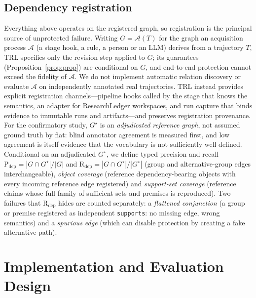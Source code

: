 \documentclass[cmc,article,submit,moreauthors,pdftex]{Definitions/tsp}
\begin{document}
\subsection{Dependency registration}
\label{sec:registration}
Everything above operates on the registered graph, so registration is the principal source of unprotected failure. Writing $G=\mathcal{A}(T)$ for the graph an acquisition process $\mathcal{A}$ (a stage hook, a rule, a person or an LLM) derives from a trajectory $T$, TRL specifies only the revision step applied to $G$; its guarantees (Proposition~\ref{prop:prop}) are conditional on $G$, and end-to-end protection cannot exceed the fidelity of $\mathcal{A}$. We do not implement automatic relation discovery or evaluate $\mathcal{A}$ on independently annotated real trajectories. TRL instead provides explicit registration channels---pipeline hooks called by the stage that knows the semantics, an adapter for ResearchLedger workspaces, and run capture that binds evidence to immutable runs and artifacts---and preserves registration provenance. For the confirmatory study, $G^\star$ is an \emph{adjudicated reference graph}, not assumed ground truth by fiat: blind annotator agreement is measured first, and low agreement is itself evidence that the vocabulary is not sufficiently well defined. Conditional on an adjudicated $G^\star$, we define typed precision and recall $\mathrm{P}_{\mathrm{dep}}=|G\cap G^\star|/|G|$ and $\mathrm{R}_{\mathrm{dep}}=|G\cap G^\star|/|G^\star|$ (group and alternative-group edges interchangeable), \emph{object coverage} (reference dependency-bearing objects with every incoming reference edge registered) and \emph{support-set coverage} (reference claims whose full family of sufficient sets and premises is reproduced). Two failures that $\mathrm{R}_{\mathrm{dep}}$ hides are counted separately: a \emph{flattened conjunction} (a group or premise registered as independent \texttt{supports}: no missing edge, wrong semantics) and a \emph{spurious edge} (which can disable protection by creating a fake alternative path).

\section{Implementation and Evaluation Design}
\label{sec:design}
\end{document}
